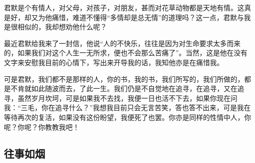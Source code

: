 \par 君默是个有情人，对父母，对孩子，对朋友，甚而对花草动物都是天地有情。这真是好，却又为他痛惜，难道不懂得“多情却是总无情”的道理吗？这一点，君默与我是很相似的，我却想劝他什么呢？
\par 最近君默给我来了一封信，他说“人的不快乐，往往是因为对生命要求太多而来的，如果我们对这个人生一无所求，便也不会那么苦痛了”。当然，这是他在没有文字来安慰我目前的心情下，写出来开导我的话，我知他亦是在痛惜我。
\par 可是君默，我们都不是那样的人，你的书，我的书，我们所写的，我们所做的，都是不肯就如此随波而去，了此一生。我们仍是不自觉地在追寻，在追寻，又在追寻，虽然岁月坎坷，可是如果我不去找，我便一日也活不下去，如果你现在问我：“三毛，你在追寻什么？”我想我目前只会无言苦笑，答也答不出来，可是我在等待再次的复活，如果没有这份盼望，我便死了也罢。你亦是同样的性情中人，你呢？你呢？你教教我吧！



\subsection{往事如烟}


